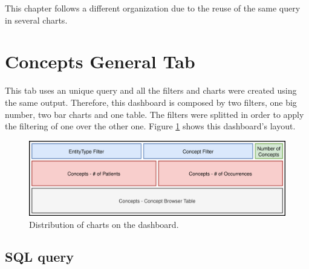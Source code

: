 \documentclass[
]{book}
\begin{document}
This chapter follows a different organization due to the reuse of the same query in several charts.

\hypertarget{concepts-general-tab}{%
\section{Concepts General Tab}\label{concepts-general-tab}}

This tab uses an unique query and all the filters and charts were created using the same output. Therefore, this dashboard is composed by two filters, one big number, two bar charts and one table. The filters were splitted in order to apply the filtering of one over the other one. Figure \ref{fig:conceptsGeneralLayout} shows this dashboard's layout.

\begin{figure}
\includegraphics[width=1\linewidth]{images/conceptsGeneralLayout} \caption{Distribution of charts on the dashboard.}\label{fig:conceptsGeneralLayout}
\end{figure}

\hypertarget{sql-query-22}{%
\subsection{SQL query}\label{sql-query-22}}
\end{document}

